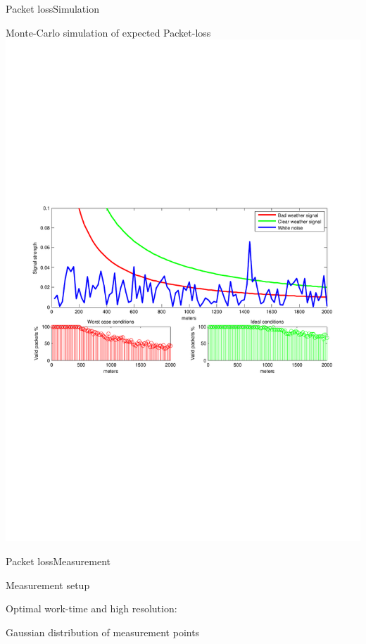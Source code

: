 \begin{frame}{Packet loss}{Simulation}
    \begin{block}{Monte-Carlo simulation of expected Packet-loss}
    \includegraphics[trim = 0mm 80mm 0mm 80mm, clip, width=\textwidth]{img/packetloss}
    \end{block}
\end{frame}

\begin{frame}{Packet loss}{Measurement}
    \begin{block}{Measurement setup}
		\item Optimal work-time and high resolution:
		\item Gaussian distribution of measurement points
		
    \end{block}
\end{frame}